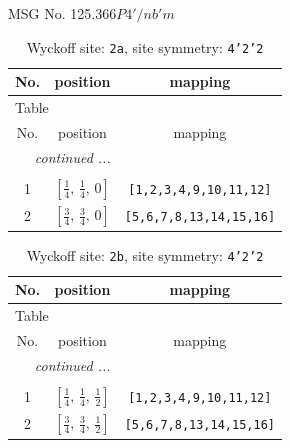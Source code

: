\documentclass[fleqn,8pt]{jsarticle}
\begin{document}
\setcounter{MaxMatrixCols}{32}

\renewcommand{\tablename}{Table~}
\renewcommand{\figurename}{Figure~}
\begin{center}
\LARGE
MSG No. 125.366\quad$P4'/nb'm$
\end{center}
\renewcommand{\arraystretch}{1.2}
\begin{longtable}{ccc}
\caption{Wyckoff site: {\tt 2a}, site symmetry: {\tt 4'2'2}}
 \\
 \hline \hline
No. & position & mapping \\ \hline \endfirsthead

\multicolumn{2}{l}{\tablename\ \thetable{}} \\
 \hline \hline
No. & position & mapping \\ \hline \endhead

 \hline \hline
\multicolumn{2}{r}{\footnotesize\it continued ...} \\ \endfoot

 \hline \hline
\multicolumn{2}{r}{} \\ \endlastfoot

1 & $\left[ \frac{1}{4},\, \frac{1}{4},\, 0 \right]$ & {\tt [1,2,3,4,9,10,11,12]} \\ \hline
2 & $\left[ \frac{3}{4},\, \frac{3}{4},\, 0 \right]$ & {\tt [5,6,7,8,13,14,15,16]} \\
\end{longtable}
\renewcommand{\arraystretch}{1.2}
\begin{longtable}{ccc}
\caption{Wyckoff site: {\tt 2b}, site symmetry: {\tt 4'2'2}}
 \\
 \hline \hline
No. & position & mapping \\ \hline \endfirsthead

\multicolumn{2}{l}{\tablename\ \thetable{}} \\
 \hline \hline
No. & position & mapping \\ \hline \endhead

 \hline \hline
\multicolumn{2}{r}{\footnotesize\it continued ...} \\ \endfoot

 \hline \hline
\multicolumn{2}{r}{} \\ \endlastfoot

1 & $\left[ \frac{1}{4},\, \frac{1}{4},\, \frac{1}{2} \right]$ & {\tt [1,2,3,4,9,10,11,12]} \\ \hline
2 & $\left[ \frac{3}{4},\, \frac{3}{4},\, \frac{1}{2} \right]$ & {\tt [5,6,7,8,13,14,15,16]} \\
\end{longtable}
\end{document}
